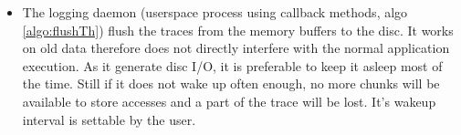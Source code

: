 \begin{itemize}
\begin{itemize}
                \begin{algorithm}[htb]
                    \caption{logging process}
                    \label{algo:flushTh}
                    \begin{algorithmic}[1]
                                \State {}
                                \State {}
                                \State {}
                                \EndFor
                            \EndFor
                            \State {}
                        \EndWhile
                    \end{algorithmic}
                \end{algorithm}
            \item The logging daemon (userspace process using callback
                methods, algo \ref{algo:flushTh}) flush the traces from the
                memory buffers to the disc. It works on old data therefore
                does not directly interfere with the normal application
                execution. As it generate disc I/O, it is preferable to keep
                it asleep most of the time. Still if it does not wake up often
                enough, no more chunks will be available to store accesses and
                a part of the trace will be lost. It's wakeup interval is
                settable by the user.


\end{itemize}
\end{itemize}

